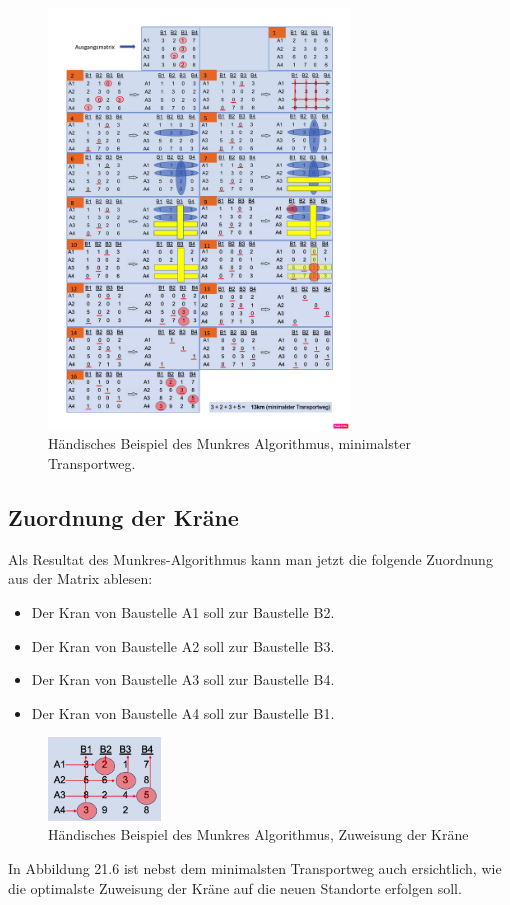 \begin{figure}
\centering
\includegraphics[width=8cm]{papers/munkres/figures/Ungarische_Methode_Beispiel.png}
\caption{Händisches Beispiel des Munkres Algorithmus, minimalster Transportweg.}
\label{munkres:Vr2}
\end{figure}

\subsection{Zuordnung der Kräne
\label{munkres:subsection:malorum}}

Als Resultat des Munkres-Algorithmus kann man jetzt die folgende Zuordnung aus der Matrix ablesen:
\begin{itemize}
\item Der Kran von Baustelle A1 soll zur Baustelle B2.
\item Der Kran von Baustelle A2 soll zur Baustelle B3.
\item Der Kran von Baustelle A3 soll zur Baustelle B4.
\item Der Kran von Baustelle A4 soll zur Baustelle B1.
\end{itemize}

\begin{figure}
\centering
\includegraphics[width=3cm]{papers/munkres/figures/Ungarische_Methode_Beispiel_Zuw.png}
\caption{Händisches Beispiel des Munkres Algorithmus, Zuweisung der Kräne }
\label{munkres:Vr2}
\end{figure} 

In Abbildung 21.6 ist nebst dem minimalsten Transportweg auch ersichtlich, wie die optimalste Zuweisung der Kräne auf die neuen Standorte erfolgen soll.